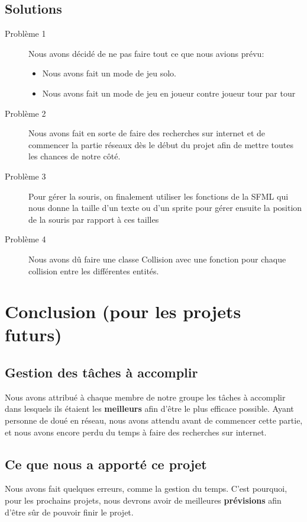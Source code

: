 \documentclass[french, 11pt]{report}
\begin{document}
			\subsection{Solutions}
			\begin{description}	
				\item[Problème 1] Nous avons décidé de ne pas faire tout ce que nous avions prévu:
				\begin{itemize}
					\item Nous avons fait un mode de jeu solo.
					\item Nous avons fait un mode de jeu en joueur contre joueur tour par tour
				\end{itemize}
				\item[Problème 2] Nous avons fait en sorte de faire des recherches sur internet et de commencer la partie réseaux dès le début du projet afin de mettre toutes les chances de notre côté. %
				\item[Problème 3] Pour gérer la souris, on finalement utiliser les fonctions de la SFML qui nous donne la taille d'un texte ou d'un sprite pour gérer ensuite la position de la souris par rapport à ces tailles
				\item[Problème 4] Nous avons dû faire une classe Collision avec une fonction pour chaque collision entre les différentes entités.
			\end{description}								
			
		\section{Conclusion (pour les projets futurs)}
			\subsection{Gestion des tâches à accomplir}
				Nous avons attribué à chaque membre de notre groupe les tâches à accomplir dans lesquels ils étaient les \textbf{meilleurs} afin d'être le plus efficace possible.
				Ayant personne de doué en réseau, nous avons attendu avant de commencer cette partie, et nous avons encore perdu du temps à faire des recherches sur internet.
			\subsection{Ce que nous a apporté ce projet}
				Nous avons fait quelques erreurs, comme la gestion du temps.
				C'est pourquoi, pour les prochains projets, nous devrons avoir de meilleures \textbf{prévisions} afin d'être sûr de pouvoir finir le projet.
				
\end{document}
